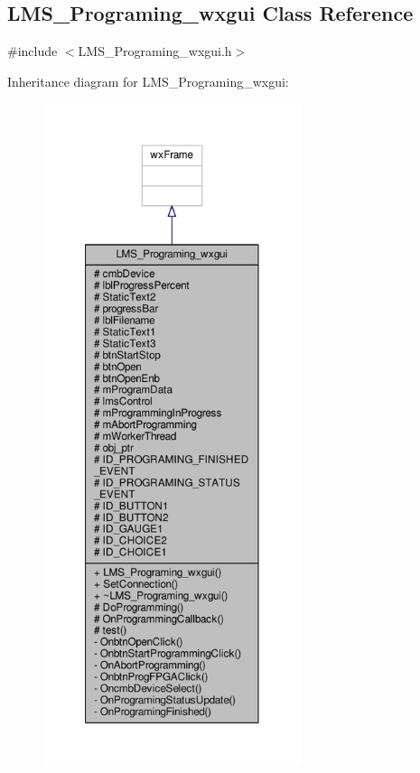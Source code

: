 \subsection{L\+M\+S\+\_\+\+Programing\+\_\+wxgui Class Reference}
\label{classLMS__Programing__wxgui}


{\ttfamily \#include $<$L\+M\+S\+\_\+\+Programing\+\_\+wxgui.\+h$>$}



Inheritance diagram for L\+M\+S\+\_\+\+Programing\+\_\+wxgui\+:
\nopagebreak
\begin{figure}[H]
\begin{center}
\leavevmode
\includegraphics[height=550pt]{d3/d22/classLMS__Programing__wxgui__inherit__graph}
\end{center}
\end{figure}



